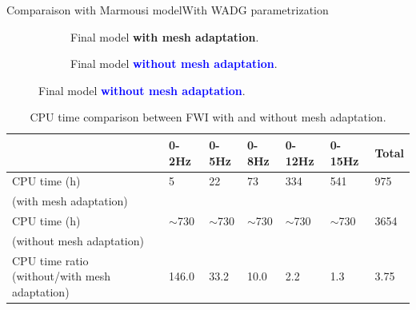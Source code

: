 \begin{frame}[noframenumbering]{Comparaison with Marmousi model}{With WADG parametrization}
    \vspace{-0.8cm}
  \setlength{\modelwidth}{6.0cm}
  \begin{figure}[!htbp]
    \renewcommand{\modelfile}{image/mesh_adapt/wadg_adapt_vp_80}
     \begin{subfigure}[!htbp]{0.5\textwidth}
        \vspace{0.5cm}
        \hspace{-0.5cm}
         \centering
         
                  \caption*{Final model \textcolor{\mygreen}{\textbf{with mesh adaptation}}.}
         \label{marmousi_mesh_padapt}
     \end{subfigure}
     \hspace{-1cm}
     \renewcommand{\modelfile}{image/mesh_adapt/wadg_classic_vp_80}
     \renewcommand{\cmapmin}{1500}
     \renewcommand{\cmapmax}{5000}
     \begin{subfigure}[!htbp]{0.5\textwidth}
         \centering
         
         \vspace{-0.6cm}
                  \caption*{Final model \textcolor{blue}{\textbf{without mesh adaptation}}.}
     \end{subfigure}
  \end{figure}

  \scriptsize
\begin{table}[!htbp]
\begin{tabular}{|m{4.0cm}|l|l|l|l|l|l|}
\hline
& 0-2Hz     & 0-5Hz     & 0-8Hz     & 0-12Hz    & 0-15Hz    & Total  \\ \hline
\rowcolor{green!30}
CPU time (h)          & 5         & 22        & 73        & 334       & 541       & 975   \\
\rowcolor{green!30}
(with mesh adaptation)          &          &         &         &        &        &    \\ \hline
\rowcolor{blue!30}
CPU time (h)       & $\sim$730 & $\sim$730 & $\sim$730 & $\sim$730 & $\sim$730 & 3654   \\
\rowcolor{blue!30}
(without mesh adaptation)       &  &  &  &  &  &    \\ \hline
CPU time ratio \newline (without/with mesh adaptation) &  146.0    &    33.2   &   10.0    &    2.2    &   1.3     & \cellcolor{red!30} 3.75   \\ \hline
\end{tabular}
\caption*{CPU time comparison between FWI with and without mesh adaptation.}
\label{wadg_cpu_tab}
\end{table}
\end{frame}





